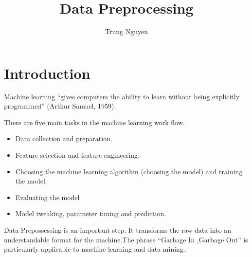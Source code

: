 \documentclass[a4paper,10pt]{article}
\title{Data Preprocessing}
\author{Trung Nguyen}
\date{}
\begin{document}
\maketitle

\tableofcontents

\section{Introduction}

Machine learning “gives computers the ability to learn without being explicitly programmed” (Arthur Samuel, 1959).\newline


There are five main tasks in the machine learning work flow.

\begin{itemize}
	\item Data collection and preparation.
	\item Feature selection and feature engineering.
	\item Choosing the machine learning algorithm (choosing the model) and training the model.
	\item Evaluating the model
	\item Model tweaking, parameter tuning and prediction.
\end{itemize}
Data Prepossessing is an important step. It transforms the raw data into an understandable format for the machine.The phrase “Garbage In ,Garbage Out” is particularly applicable to machine learning and data mining.
\end{document}
